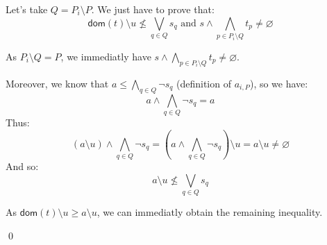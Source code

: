 \documentclass[a4paper]{article}%
\newcommand{\dom}[1]{\textsf{dom}(#1)}
\begin{document}
    Let's take $Q = P_i \setminus P$. We just have to prove that:
    \[ \dom t \setminus u \not\leq\bigvee_{q\in Q}s_q \text{\ \ \ and\ \ \ } s \land \bigwedge_{p\in P_i\setminus Q}t_p \neq \varnothing \]

    As $P_i \setminus Q = P$, we immediatly have $s \land \bigwedge_{p\in P_i\setminus Q}t_p \neq \varnothing$.

    Moreover, we know that $a \leq \bigwedge_{q \in Q} \neg s_q$ (definition of $a_{i,P}$), so we have:
    \[a \land \bigwedge_{q\in Q} \neg s_q = a\]
    Thus: \[(a \setminus u) \land \bigwedge_{q\in Q} \neg s_q = (a \land \bigwedge_{q\in Q} \neg s_q) \setminus u = a \setminus u \neq \varnothing\]
    And so: \[ a \setminus u \not\leq \bigvee_{q\in Q}s_q \]

    As $ \dom t \setminus u \geq a \setminus u$, we can immediatly obtain the remaining inequality.

    \qed
    \pagebreak

    
\end{document}

